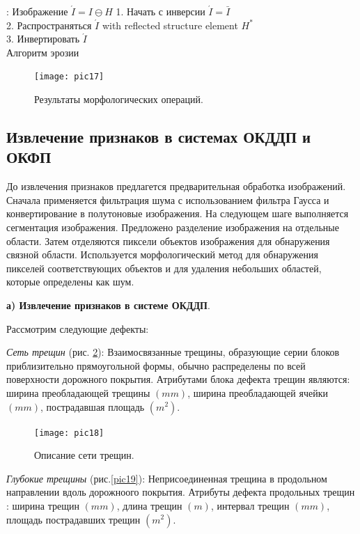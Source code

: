 \documentclass[a4paper,14pt]{extreport}
\begin{document}
\begin{algorithm}[H]
\KwResult: {Изображение $\acute{I} = I \ominus H$}
 1. Начать с инверсии $\acute{I} = \bar{I}$\\
 2. Распространяться $\acute{I}$ with reflected structure element $H^*$\\
 3. Инвертировать $\acute{I}$\\
\caption{Алгоритм эрозии} \label{alg2}
\end{algorithm}

\begin{figure}[ht!]
\centering
\texttt{[image: pic17]}
\caption{Результаты морфологических операций.}
	\label{pic17}
		\end{figure}
		
\subsection{Извлечение признаков в системах ОКДДП и ОКФП}

До извлечения признаков предлагется предварительная обработка изображений. Сначала  применяется фильтрация шума с использованием фильтра Гаусса и конвертирование в полутоновые изображения. На следующем шаге выполняется сегментация изображения. Предложено разделение изображения на отдельные области. Затем отделяются пиксели объектов изображения для обнаружения связной области. Используется морфологический метод для обнаружения пикселей соответствующих объектов и для удаления небольших областей, которые определены как шум. 

\textbf{а) Извлечение признаков в системе ОКДДП}.

Рассмотрим следующие дефекты:
 
\textit{Сеть трещин} (рис. \ref{pic18}): Взаимосвязанные трещины, образующие серии блоков приблизительно прямоугольной формы, обычно распределены по всей поверхности дорожного покрытия. Атрибутами блока дефекта трещин  являются: ширина преобладающей трещины $\left(mm\right)$, ширина преобладающей ячейки $\left(mm\right)$, пострадавшая площадь $\left(m^2\right)$.
 
\begin{figure}[ht!]
\centering
\texttt{[image: pic18]}
\caption{Описание сети трещин.}
	\label{pic18}
		\end{figure}
		
\textit{Глубокие трещины} (рис.\ref{pic19}): Неприсоединенная трещина в продольном направлении вдоль дорожноого покрытия. Атрибуты дефекта продольных трещин : ширина трещин $(mm)$, длина трещин $(m)$, интервал трещин $(mm)$, площадь пострадавших трещин $(m^2)$.
\end{document}
